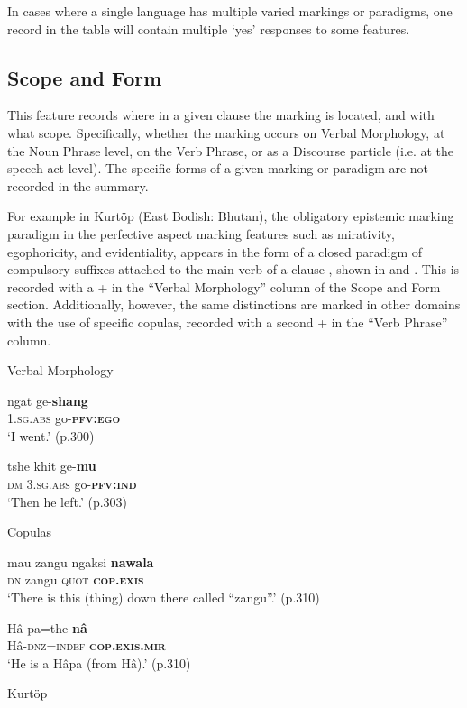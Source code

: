 In cases where a single language has multiple varied markings or paradigms, one record in the table will contain multiple `yes' responses to some features.

\subsection{Scope and Form}
This feature records where in a given clause the marking is located, and with what scope. Specifically, whether the marking occurs on Verbal Morphology, at the Noun Phrase level, on the Verb Phrase, or as a Discourse particle (i.e. at the speech act level). The specific forms of a given marking or paradigm are not recorded in the summary.

For example in Kurtöp (East Bodish: Bhutan), the obligatory epistemic marking paradigm in the perfective aspect marking features such as mirativity, egophoricity, and evidentiality, appears in the form of a closed paradigm of compulsory suffixes attached to the main verb of a clause \cite{Hyslop2018}, shown in  and . This is recorded with a + in the ``Verbal Morphology'' column of the Scope and Form section. Additionally, however, the same distinctions are marked in other domains with the use of specific copulas, recorded with a second + in the ``Verb Phrase'' column.

\begin{exe}
\ex Verbal Morphology \label{e:Methods:KurtopScope1}
\begin{xlist}
\ex
\gll ngat ge-\textbf{shang} \\
1.\textsc{sg.abs} go-\textsc{\textbf{pfv:ego}} \\
\glt `I went.' (p.300)

\ex
\gll tshe khit ge-\textbf{mu} \\
\textsc{dm} \textsc{3.sg.abs} go-\textsc{\textbf{pfv:ind}} \\
\glt `Then he left.' (p.303)

\end{xlist}

\ex Copulas \label{e:Methods:KurtopScope2}
\begin{xlist}
\ex 
\gll mau zangu ngaksi \textbf{nawala} \\
\textsc{dn} zangu \textsc{quot} \textsc{\textbf{cop.exis}} \\
\glt `There is this (thing) down there called ``zangu''.' (p.310)

\ex
\gll Hâ-pa=the \textbf{nâ} \\
Hâ-\textsc{dnz=indef} \textsc{\textbf{cop.exis.mir}} \\
\glt `He is a Hâpa (from Hâ).' (p.310)
\end{xlist}
Kurtöp \cite[East Bodish: Bhutan,][]{Hyslop2017}
\end{exe}

